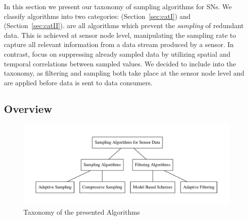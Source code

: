 In this section we present our taxonomy of sampling algorithms for \acp{SN}. We
classify algorithms into two categories: \catI (Section~\ref{sec:catI}) and
\catII (Section~\ref{sec:catII}). %
\catI are all algorithms which prevent the \textit{sampling} of redundant data.
This is achieved at sensor node level, manipulating the sampling rate to
capture all relevant information from a data stream produced by a sensor. In
contrast, \catII focus on suppressing already sampled data by utilizing spatial
and temporal correlations between sampled values. We decided to include \catII
into the taxonomy, as filtering and sampling both take place at the sensor node
level and are applied before data is sent to data consumers.



\subsection{Overview}
\label{sec:Overview}



\begin{figure}[h]
\includegraphics[width=\linewidth]{images/taxonomy.pdf}
\caption{Taxonomy of the presented Algorithms}
\label{fig:Taxonomy}
\centering
\end{figure}

